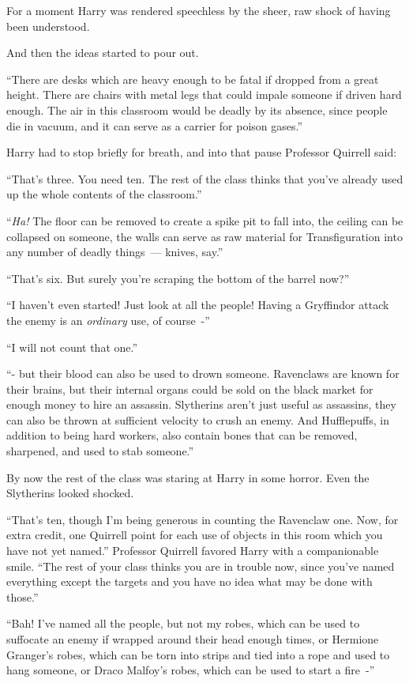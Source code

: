 For a moment Harry was rendered speechless by the sheer, raw shock of having been understood.

And then the ideas started to pour out.

``There are desks which are heavy enough to be fatal if dropped from a great height. There are chairs with metal legs that could impale someone if driven hard enough. The air in this classroom would be deadly by its absence, since people die in vacuum, and it can serve as a carrier for poison gases.''

Harry had to stop briefly for breath, and into that pause Professor Quirrell said:

``That's three. You need ten. The rest of the class thinks that you've already used up the whole contents of the classroom.''

``\emph{Ha!} The floor can be removed to create a spike pit to fall into, the ceiling can be collapsed on someone, the walls can serve as raw material for Transfiguration into any number of deadly things~--- knives, say.''

``That's six. But surely you're scraping the bottom of the barrel now?''

``I haven't even started! Just look at all the people! Having a Gryffindor attack the enemy is an \emph{ordinary} use, of course~-''

``I will not count that one.''

``- but their blood can also be used to drown someone. Ravenclaws are known for their brains, but their internal organs could be sold on the black market for enough money to hire an assassin. Slytherins aren't just useful as assassins, they can also be thrown at sufficient velocity to crush an enemy. And Hufflepuffs, in addition to being hard workers, also contain bones that can be removed, sharpened, and used to stab someone.''

By now the rest of the class was staring at Harry in some horror. Even the Slytherins looked shocked.

``That's ten, though I'm being generous in counting the Ravenclaw one. Now, for extra credit, one Quirrell point for each use of objects in this room which you have not yet named.'' Professor Quirrell favored Harry with a companionable smile. ``The rest of your class thinks you are in trouble now, since you've named everything except the targets and you have no idea what may be done with those.''

``Bah! I've named all the people, but not my robes, which can be used to suffocate an enemy if wrapped around their head enough times, or Hermione Granger's robes, which can be torn into strips and tied into a rope and used to hang someone, or Draco Malfoy's robes, which can be used to start a fire~-''

